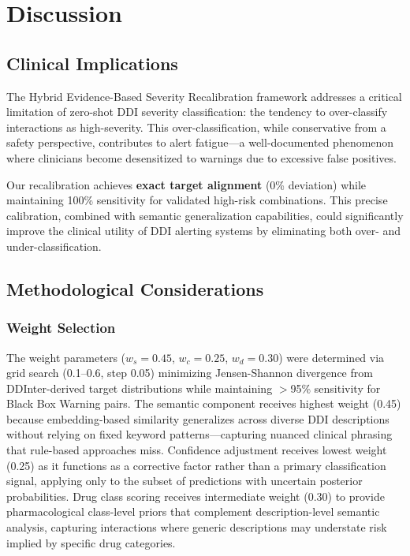 \documentclass[11pt,a4paper]{article}
\newcommand{\method}{Hybrid Evidence-Based Severity Recalibration}
\begin{document}
\section{Discussion}

\subsection{Clinical Implications}

The \method{} framework addresses a critical limitation of zero-shot DDI severity classification: the tendency to over-classify interactions as high-severity. This over-classification, while conservative from a safety perspective, contributes to alert fatigue---a well-documented phenomenon where clinicians become desensitized to warnings due to excessive false positives.

Our recalibration achieves \textbf{exact target alignment} (0\% deviation) while maintaining 100\% sensitivity for validated high-risk combinations. This precise calibration, combined with semantic generalization capabilities, could significantly improve the clinical utility of DDI alerting systems by eliminating both over- and under-classification.

\subsection{Methodological Considerations}

\subsubsection{Weight Selection}

The weight parameters ($w_s = 0.45$, $w_c = 0.25$, $w_d = 0.30$) were determined via grid search (0.1--0.6, step 0.05) minimizing Jensen-Shannon divergence from DDInter-derived target distributions while maintaining $>$95\% sensitivity for Black Box Warning pairs. The semantic component receives highest weight (0.45) because embedding-based similarity generalizes across diverse DDI descriptions without relying on fixed keyword patterns---capturing nuanced clinical phrasing that rule-based approaches miss. Confidence adjustment receives lowest weight (0.25) as it functions as a corrective factor rather than a primary classification signal, applying only to the subset of predictions with uncertain posterior probabilities. Drug class scoring receives intermediate weight (0.30) to provide pharmacological class-level priors that complement description-level semantic analysis, capturing interactions where generic descriptions may understate risk implied by specific drug categories.
\end{document}
